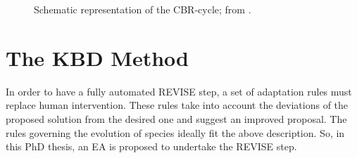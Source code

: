 \begin{figure}[h!]
\begin{minipage}[b]{1\linewidth}
 \centering
\end{minipage}
\caption{Schematic representation of the CBR-cycle; from \cite{aamond_plaza_1994}.} 
\label{cbr}
\end{figure}


\section{The KBD Method}


In order to have a fully automated REVISE step, a set of adaptation rules must replace human intervention. These rules take into account the deviations of the proposed solution from the desired one and suggest an improved proposal. The rules governing the evolution of species ideally fit the above description. So, in this PhD thesis, an EA is proposed to undertake the REVISE step. 

